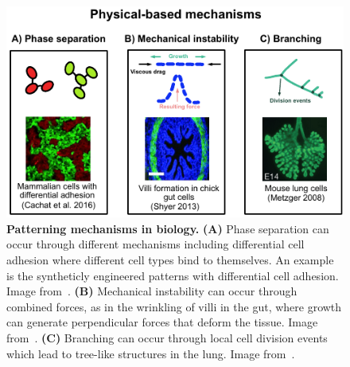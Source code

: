 \begin{figure}[H]
    \centering
    \includegraphics[width=1\textwidth]{chapters/Introduction/physical_based_mechanisms}
    \caption{\textbf{Patterning mechanisms in biology.} \textbf{(A)}
    Phase separation can occur through different mechanisms including differential cell adhesion where different cell types bind to themselves. An example is the syntheticly engineered patterns with differential cell adhesion. Image from~\cite{cachat20162}.  \textbf{(B)} Mechanical instability can occur through combined forces, as in the wrinkling of villi in the gut, where growth can generate perpendicular forces that deform the tissue. Image from~\cite{shyer2013villification}.
    \textbf{(C)} Branching can occur through local cell division events which lead to tree-like structures in the lung. Image from~\cite{metzger2008branching}.}
    \label{fig:physical_based_mechanisms}
\end{figure}

